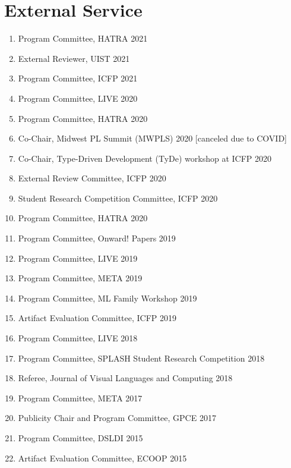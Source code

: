 \documentclass[10pt,letterpaper]{article}
\begin{document}
\section*{External Service}
\begin{enumerate}
  \item Program Committee, HATRA 2021
  \item External Reviewer, UIST 2021
  \item Program Committee, ICFP 2021
  \item Program Committee, LIVE 2020
  \item Program Committee, HATRA 2020
  \item Co-Chair, Midwest PL Summit (MWPLS) 2020 [canceled due to COVID]
  \item Co-Chair, Type-Driven Development (TyDe) workshop at ICFP 2020
  \item External Review Committee, ICFP 2020
  \item Student Research Competition Committee, ICFP 2020
  \item Program Committee, HATRA 2020
  \item Program Committee, Onward! Papers 2019	
  \item Program Committee, LIVE 2019
  \item Program Committee, META 2019
  \item Program Committee, ML Family Workshop 2019
  \item Artifact Evaluation Committee, ICFP 2019
  \item Program Committee, LIVE 2018
  \item Program Committee, SPLASH Student Research Competition 2018
  \item Referee, Journal of Visual Languages and Computing 2018
  \item Program Committee, META 2017
  \item Publicity Chair and Program Committee, GPCE 2017
  \item Program Committee, DSLDI 2015
  \item Artifact Evaluation Committee, ECOOP 2015
\end{enumerate}
\end{document}

